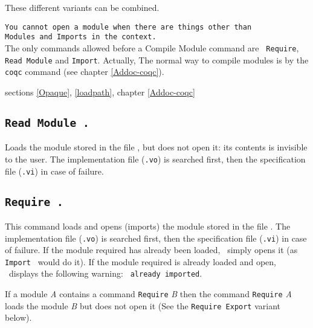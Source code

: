 These different variants can be combined.


\begin{ErrMsgs}
\item \texttt{You cannot open a module when there are things other than}\\
  \texttt{Modules and Imports in the context.}\\ 
  The only commands allowed before a {Compile Module} command are {\tt
    Require},\\
  {\tt Read Module} and {\tt Import}. Actually, The normal way to
  compile modules is by the {\tt coqc} command (see chapter
  \ref{Addoc-coqc}).
\end{ErrMsgs}

\SeeAlso sections \ref{Opaque}, \ref{loadpath}, chapter
\ref{Addoc-coqc}

\subsection{\tt Read Module {\ident}.}
Loads the module stored in the file {\ident}, but does not open it:
its contents is invisible to the user. The implementation file
({\ident}{\tt.vo}) is searched first, then the specification file
({\ident}{\tt.vi}) in case of failure.

\subsection{\tt Require {\ident}.}
\label{Require}
This command loads and opens (imports) the module stored in the file
{\ident}. The implementation file ({\ident}{\tt .vo}) is searched first,
then the specification file ({\ident}{\tt .vi}) in case of failure.
If the module required has already been loaded, \Coq\ 
simply opens it (as {\tt Import {\ident}} would do it).
If the module required is already loaded and open, \Coq\ 
displays the following warning: {\tt {\ident} already imported}.

If a module {\it A} contains a command {\tt Require} {\it B} then the
command {\tt Require} {\it A} loads the module {\it B} but does not
open it (See the {\tt Require Export} variant below).

